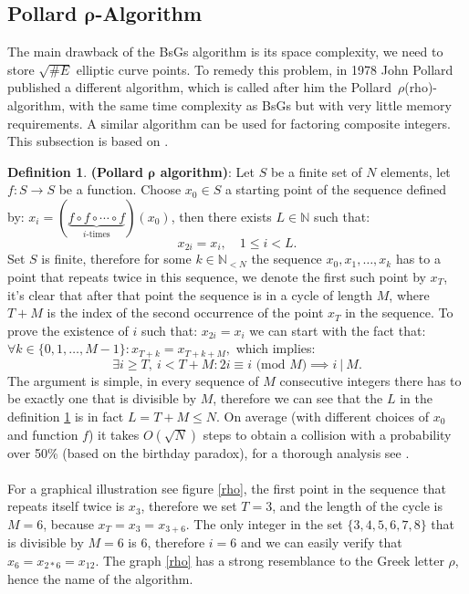 \documentclass[thesis=M,english]{FITthesis}[2012/10/20]
\theoremstyle{remark}
\theoremstyle{definition}
\newtheorem{DF}{Definition}[section]
\begin{document}
\subsection{Pollard $\mathbf{\rho}$-Algorithm}
\noindent The main drawback of the BsGs algorithm is its space complexity, we need to store $\sqrt{\#E}$ elliptic curve points. To remedy this problem, in 1978 John Pollard published a different algorithm, which is called after him the Pollard~$\rho$(rho)-algorithm, with the same time complexity as BsGs but with very little memory requirements. A similar algorithm can be used for factoring composite integers. This subsection is based on \cite{mky}.
\begin{DF}
\label{pol}
 \textbf{(Pollard $\mathbf{\rho}$ algorithm)}: Let $S$ be a finite set of $N$ elements, let $f: S \to S$ be a function. Choose $x_0 \in S$ a starting point of the sequence defined by: $x_i = (\underbrace{f\circ f \circ \cdots \circ f}_\text{$i$-times})(x_0)$, then there exists $L \in \mathbb{N}$ such that:
 $$
 x_{2i} = x_i, \quad 1\leq i < L.
 $$
Set $S$ is finite, therefore for some $k \in \mathbb{N}_{< N}$ the sequence $x_0, x_1, \ldots, x_k$ has to a point that repeats twice in this sequence, we denote the first such point by $x_T$, it's clear that after that point the sequence is in a cycle of length $M$, where $T+M$ is the index of the second occurrence of the point $x_T$ in the sequence. To prove the existence of $i$ such that: $x_{2i} = x_i$ we can start with the fact that: $\forall k \in \{0, 1, \ldots, M-1\}: x_{T+k} = x_{T+k+M},$ which implies:
$$
\exists i \geq T,\ i < T + M: 2i \equiv i \text{ (mod $M$)} \implies i\ |\ M.
$$
The argument is simple, in every sequence of $M$ consecutive integers there has to be exactly one that is divisible by $M$, therefore we can see that the $L$ in the definition \ref{pol} is in fact $L= T + M \leq N$. On average (with different choices of $x_0$ and function $f$) it takes $O(\sqrt{N})$ steps to obtain a collision with a probability over 50\% (based on the birthday paradox), for a thorough analysis see \cite{polProb}. \\ \\
\noindent For a graphical illustration see figure \ref{rho}, the first point in the sequence that repeats itself twice is $x_3$, therefore we set $T = 3$, and the length of the cycle is $M = 6$, because $x_T = x_3 = x_{3+6}$. The only integer in the set $\{3,4,5,6,7,8\}$ that is divisible by $M = 6$ is $6$, therefore $i=6$ and we can easily verify that $x_6 = x_{2*6} = x_{12}$. The graph \ref{rho} has a strong resemblance to the Greek letter $\rho$, hence the name of the algorithm.

\end{DF}
\end{document}
